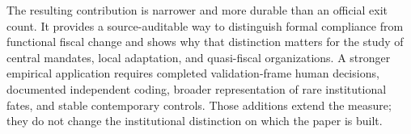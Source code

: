 The resulting contribution is narrower and more durable than an official exit
count. It provides a source-auditable way to distinguish formal compliance from
functional fiscal change and shows why that distinction matters for the study
of central mandates, local adaptation, and quasi-fiscal organizations. A
stronger empirical application requires completed validation-frame human
decisions, documented independent coding, broader representation of rare
institutional fates, and stable contemporary controls. Those additions extend the measure;
they do not change the institutional distinction on which the paper is built.
